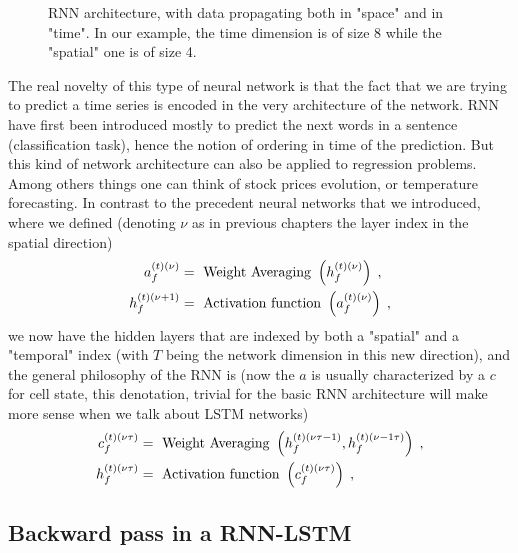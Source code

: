 \begin{figure}[H]
\begin{center}
\caption{\label{fig:RNN architecture}RNN architecture, with data propagating both in "space" and in "time". In our example, the time dimension is of size 8 while the "spatial" one is of size 4.}
\end{center}
\end{figure}

The real novelty of this type of neural network is that the fact that we are trying to predict a time series is encoded in the very architecture of the network. RNN have first been introduced mostly to predict the next words in a sentence (classification task), hence the notion of ordering in time of the prediction. But this kind of network architecture can also be applied to regression problems. Among others things one can think of stock prices evolution, or temperature forecasting. In contrast to the precedent neural networks that we introduced, where we defined (denoting $\nu$ as in previous chapters the layer index in the spatial direction)
\begin{align}
a^{(t)(\nu)}_{f}&= \text{ Weight Averaging } \left(h^{(t)(\nu)}_{f}\right)\;,\notag\\
%
h^{(t)(\nu+1)}_{f}&= \text{ Activation function } \left(a^{(t)(\nu)}_{f}\right)\;,
\end{align}
we now have the hidden layers that are indexed by both a "spatial" and a "temporal" index (with $T$ being the network dimension in this new direction), and the general philosophy of the RNN is (now the $a$ is usually characterized by a $c$ for cell state, this denotation, trivial for the basic RNN architecture will make more sense when we talk about LSTM networks)
\begin{align}
c^{(t)(\nu \tau )}_{f}&= \text{ Weight Averaging } \left(h^{(t)(\nu \tau-1)}_{f},h^{(t)(\nu-1\tau)}_{f}\right)\;,\notag\\
%
h^{(t)(\nu\tau)}_{f}&= \text{ Activation function } \left(c^{(t)(\nu \tau)}_{f}\right)\;,
\end{align}

\subsection{Backward pass in a RNN-LSTM}

